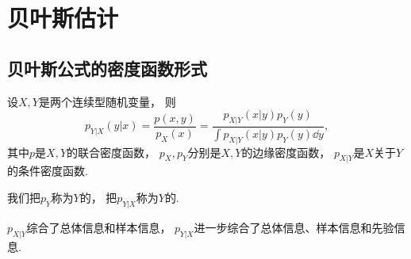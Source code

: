 \section{贝叶斯估计}
\subsection{贝叶斯公式的密度函数形式}
设\(X,Y\)是两个连续型随机变量，
则\begin{equation*}
	p_{Y \vert X}(y \vert x)
	= \frac{
		p(x,y)
	}{
		p_X(x)
	}
	= \frac{
		p_{X \vert Y}(x \vert y) p_Y(y)
	}{
		\int p_{X \vert Y}(x \vert y) p_Y(y) \dd{y}
	},
\end{equation*}
其中\(p\)是\(X,Y\)的联合密度函数，
\(p_X,p_Y\)分别是\(X,Y\)的边缘密度函数，
\(p_{X \vert Y}\)是\(X\)关于\(Y\)的条件密度函数.

我们把\(p_Y\)称为\(Y\)的，
把\(p_{Y \vert X}\)称为\(Y\)的.

\(p_{X \vert Y}\)综合了总体信息和样本信息，
\(p_{Y \vert X}\)进一步综合了总体信息、样本信息和先验信息.
